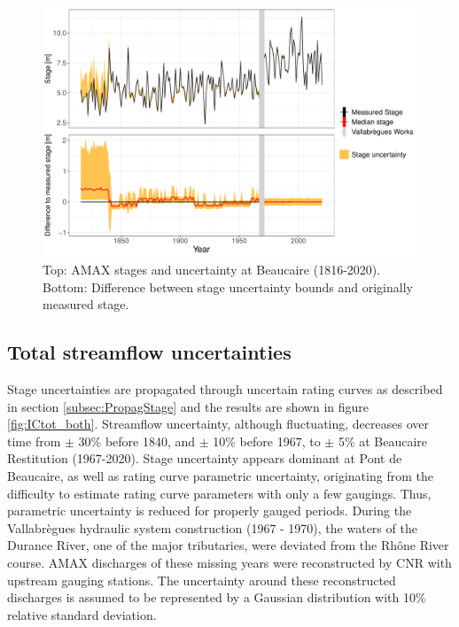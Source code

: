 \documentclass[11pt]{article}
\begin{document}
    \begin{figure}[h!]
        \centering
        \includegraphics[width=0.9\linewidth]{Figs/8-StageErrorAMAX_BOTH.pdf}\hfill
        \caption{Top: AMAX stages and uncertainty at Beaucaire (1816-2020). Bottom: Difference between stage uncertainty bounds and originally measured stage.}
        \label{fig:StageErrAMAX}
    \end{figure}
  

    \subsection{Total streamflow uncertainties}
    
    Stage uncertainties are propagated through uncertain rating curves as described in section \ref{subsec:PropagStage} and the results are shown in figure \ref{fig:ICtot_both}. Streamflow uncertainty, although fluctuating, decreases over time from $\pm$ 30\% before 1840, and $\pm$ 10\% before 1967, to $\pm$ 5\% at Beaucaire Restitution (1967-2020). Stage uncertainty appears dominant at Pont de Beaucaire, as well as rating curve parametric uncertainty, originating from the difficulty to estimate rating curve parameters with only a few gaugings. Thus, parametric uncertainty is reduced for properly gauged periods. During the Vallabrègues hydraulic system construction (1967 - 1970), the waters of the Durance River, one of the major tributaries, were deviated from the Rhône River course. AMAX discharges of these missing years were reconstructed by CNR with upstream gauging stations. The uncertainty around these reconstructed discharges is assumed to be represented by a Gaussian distribution with 10\% relative standard deviation.
    
\end{document}
